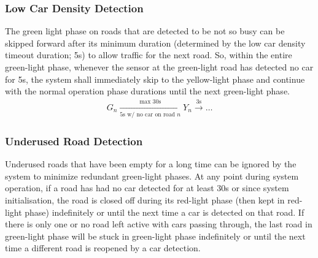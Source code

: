 \subsubsection{Low Car Density Detection}
The green light phase on roads that are detected to be not so busy can be skipped forward after its minimum duration (determined by the low car density timeout duration; 5\si{\second}) to allow traffic for the next road. So, within the entire green-light phase, whenever the sensor at the green-light road has detected no car for 5\unit{\second}, the system shall immediately skip to the yellow-light phase and continue with the normal operation phase durations until the next green-light phase.
\begin{align}
	G_n\xrightarrow[5\unit{\second}\text{ w/ no car on road $n$}]{\text{max }30\unit{\second}}Y_n\xrightarrow{3\unit{\second}}\dots
\end{align}
\subsubsection{Underused Road Detection}
Underused roads that have been empty for a long time can be ignored by the system to minimize redundant green-light phases. At any point during system operation, if a road has had no car detected for at least 30\unit{\second} or since system initialisation, the road is closed off during its red-light phase (then kept in red-light phase) indefinitely or until the next time a car is detected on that road. If there is only one or no road left active with cars passing through, the last road in green-light phase will be stuck in green-light phase indefinitely or until the next time a different road is reopened by a car detection.